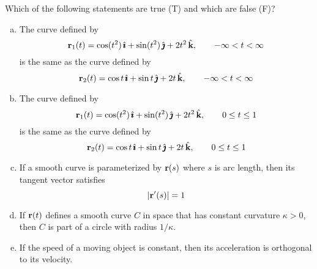 \begin{question}[M317 2008A] %
Which of the following statements are true (T) and which are false (F)?
%
\begin{enumerate}[(a)]
\item
The curve defined by
\begin{equation*}
\mathbf{r}_1(t) = \cos(t^2 )\,\hat{\pmb{\imath}} + \sin(t^2 )\,\hat{\pmb{\jmath}} + 2t^2\,\hat{\mathbf{k}},\qquad
-\infty < t < \infty
\end{equation*}
is the same as the curve defined by
\begin{equation*}
\mathbf{r}_2 (t) = \cos t\,\hat{\pmb{\imath}} + \sin t\,\hat{\pmb{\jmath}} + 2t\,\hat{\mathbf{k}},\qquad
-\infty < t < \infty
\end{equation*}

\item
The curve defined by
\begin{equation*}
\mathbf{r}_1(t) = \cos(t^2)\,\hat{\pmb{\imath}} + \sin(t^2 )\,\hat{\pmb{\jmath}} + 2t^2\,\hat{\mathbf{k}},\qquad
0 \le t \le 1
\end{equation*}
is the same as the curve defined by
\begin{equation*}
\mathbf{r}_2(t) = \cos t\,\hat{\pmb{\imath}} + \sin t\,\hat{\pmb{\jmath}} + 2t\,\hat{\mathbf{k}},\qquad
0 \le t \le 1
\end{equation*}


\item
If a smooth curve is parameterized by $\mathbf{r}(s)$ where $s$ is arc length, 
then its tangent vector satisfies
\begin{equation*}
|\mathbf{r}'(s)| = 1
\end{equation*}

\item
If $\mathbf{r}(t)$ defines a smooth curve $C$ in space that has constant 
curvature $\kappa > 0$, then $C$ is part of a circle with radius $1/\kappa$.

\item
If the speed of a moving object is constant, then its acceleration 
is orthogonal to its velocity.


\end{enumerate}
\end{question}
